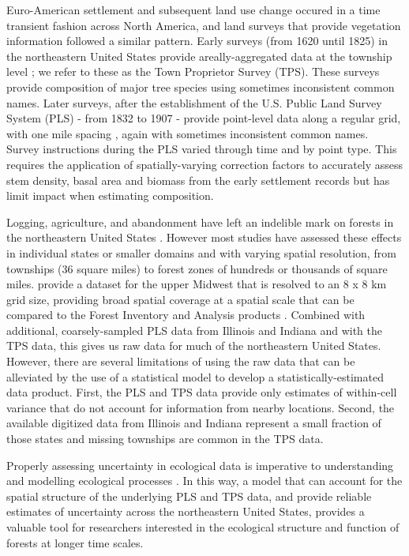\documentclass[12pt]{article}\usepackage[]{graphicx}\usepackage[]{color}
\begin{document}
Euro-American settlement and subsequent land use change occured in
a time transient fashion across North America, and land surveys that
provide vegetation information followed a similar pattern. Early surveys
(from 1620 until 1825) in the northeastern United States provide areally-aggregated
data at the township level \citep{cogbill2002forests,thompson2013four};
we refer to these as the Town Proprietor Survey (TPS). These surveys
provide composition of major tree species using sometimes inconsistent
common names. Later surveys, after the establishment of the U.S. Public
Land Survey System (PLS) - from 1832 to 1907 - provide point-level
data along a regular grid, with one mile spacing \citet{bourdo1956review,schulte2001original,goring2015composition},
again with sometimes inconsistent common names. Survey instructions
during the PLS varied through time and by point type. This requires
the application of spatially-varying correction factors \citep{cogbill2015corrections,goring2015composition}
to accurately assess stem density, basal area and biomass from the
early settlement records but has limit impact when estimating composition.

Logging, agriculture, and abandonment have left an indelible mark
on forests in the northeastern United States \citet{foster1998land,rhemtulla2009legacies,thompson2013four,goring2015composition}.
However most studies have assessed these effects in individual states
or smaller domains \citep{rhemtulla2009historical,friedman2005regional}
and with varying spatial resolution, from townships (36 square miles)
to forest zones of hundreds or thousands of square miles. \citet{goring2015composition}
provide a dataset for the upper Midwest that is resolved to an 8 x
8 km grid size, providing broad spatial coverage at a spatial scale
that can be compared to the Forest Inventory and Analysis products
\citet{gray2012forest}. Combined with additional, coarsely-sampled
PLS data from Illinois and Indiana and with the TPS data, this gives
us raw data for much of the northeastern United States. However, there
are several limitations of using the raw data that can be alleviated
by the use of a statistical model to develop a statistically-estimated
data product. First, the PLS and TPS data provide only estimates of
within-cell variance that do not account for information from nearby
locations. Second, the available digitized data from Illinois and
Indiana represent a small fraction of those states and missing townships
are common in the TPS data. 

Properly assessing uncertainty in ecological data is imperative to
understanding and modelling ecological processes \citep{cressie2009accounting}.
In this way, a model that can account for the spatial structure of
the underlying PLS and TPS data, and provide reliable estimates of
uncertainty across the northeastern United States, provides a valuable
tool for researchers interested in the ecological structure and function
of forests at longer time scales.
\end{document}
